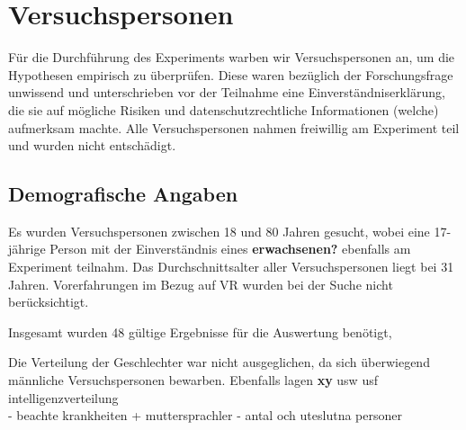 \documentclass{Bericht}
\begin{document}
	\section{Versuchspersonen}
Für die Durchführung des Experiments warben wir Versuchspersonen an, um die Hypothesen empirisch zu überprüfen.
Diese waren bezüglich der Forschungsfrage unwissend und unterschrieben vor der Teilnahme eine Einverständniserklärung, die sie auf mögliche Risiken und datenschutzrechtliche Informationen (welche) aufmerksam machte. Alle Versuchspersonen nahmen freiwillig am Experiment teil und wurden nicht entschädigt. 

\subsection{Demografische Angaben}
Es wurden Versuchspersonen zwischen 18 und 80 Jahren gesucht, wobei eine 17-jährige Person mit der Einverständnis eines \textbf{erwachsenen?} ebenfalls am Experiment teilnahm. Das Durchschnittsalter aller Versuchspersonen liegt bei 31 Jahren. Vorerfahrungen im Bezug auf VR wurden bei der Suche nicht berücksichtigt.

Insgesamt wurden 48 gültige Ergebnisse für die Auswertung benötigt, 


Die Verteilung der Geschlechter war nicht ausgeglichen, da sich überwiegend männliche Versuchspersonen bewarben. Ebenfalls lagen \textbf{xy} usw usf intelligenzverteilung \\


- beachte krankheiten + muttersprachler
- antal och uteslutna personer 
\end{document}
